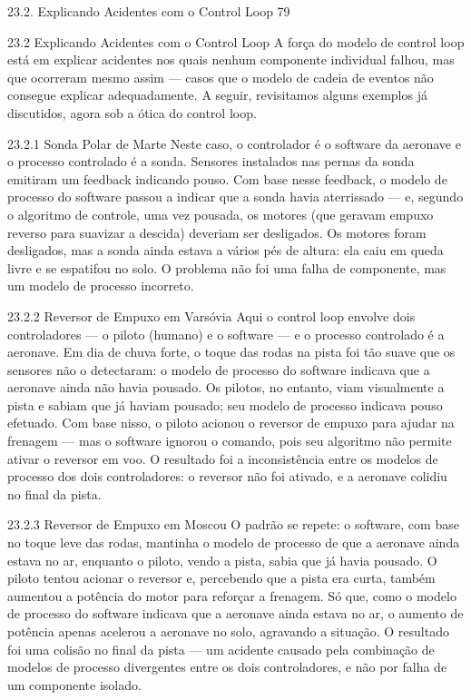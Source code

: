 23.2. Explicando Acidentes com o Control Loop 79

23.2 Explicando Acidentes com o Control Loop A força do modelo de control loop está em explicar acidentes nos quais nenhum componente individual falhou, mas que ocorreram mesmo assim — casos que o modelo de cadeia de eventos não consegue explicar adequadamente. A seguir, revisitamos alguns exemplos já discutidos, agora sob a ótica do control loop.

23.2.1 Sonda Polar de Marte Neste caso, o controlador é o software da aeronave e o processo controlado é a sonda. Sensores instalados nas pernas da sonda emitiram um feedback indicando pouso. Com base nesse feedback, o modelo de processo do software passou a indicar que a sonda havia aterrissado — e, segundo o algoritmo de controle, uma vez pousada, os motores (que geravam empuxo reverso para suavizar a descida) deveriam ser desligados. Os motores foram desligados, mas a sonda ainda estava a vários pés de altura: ela caiu em queda livre e se espatifou no solo. O problema não foi uma falha de componente, mas um modelo de processo incorreto.

23.2.2 Reversor de Empuxo em Varsóvia Aqui o control loop envolve dois controladores — o piloto (humano) e o software — e o processo controlado é a aeronave. Em dia de chuva forte, o toque das rodas na pista foi tão suave que os sensores não o detectaram: o modelo de processo do software indicava que a aeronave ainda não havia pousado. Os pilotos, no entanto, viam visualmente a pista e sabiam que já haviam pousado; seu modelo de processo indicava pouso efetuado. Com base nisso, o piloto acionou o reversor de empuxo para ajudar na frenagem — mas o software ignorou o comando, pois seu algoritmo não permite ativar o reversor em voo. O resultado foi a inconsistência entre os modelos de processo dos dois controladores: o reversor não foi ativado, e a aeronave colidiu no final da pista.

23.2.3 Reversor de Empuxo em Moscou O padrão se repete: o software, com base no toque leve das rodas, mantinha o modelo de processo de que a aeronave ainda estava no ar, enquanto o piloto, vendo a pista, sabia que já havia pousado. O piloto tentou acionar o reversor e, percebendo que a pista era curta, também aumentou a potência do motor para reforçar a frenagem. Só que, como o modelo de processo do software indicava que a aeronave ainda estava no ar, o aumento de potência apenas acelerou a aeronave no solo, agravando a situação. O resultado foi uma colisão no final da pista — um acidente causado pela combinação de modelos de processo divergentes entre os dois controladores, e não por falha de um componente isolado.


